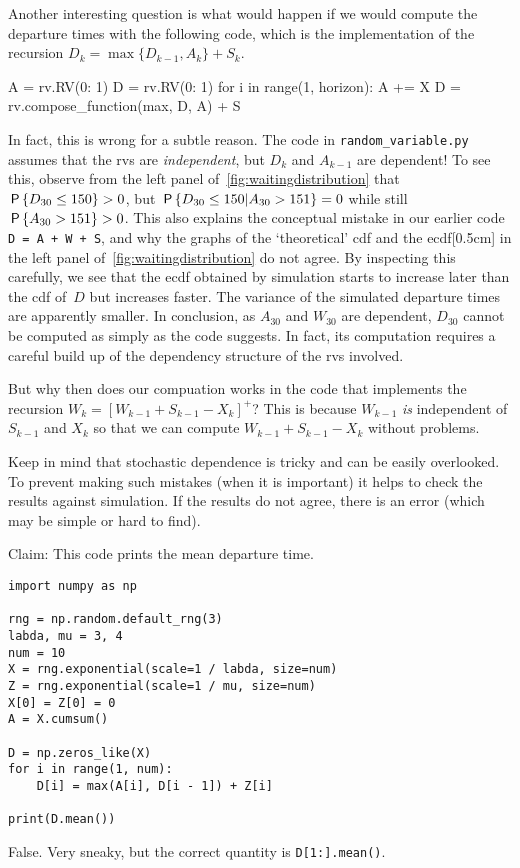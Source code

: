 \documentclass[stochastic-or.tex]{subfiles}
\begin{document}
Another interesting question is what would happen if we would compute the departure times with the following code, which is the implementation of the recursion $D_{k} = \max\{D_{k-1}, A_{k}\} + S_{k}$.
\begin{python}
A = rv.RV({0: 1})
D = rv.RV({0: 1})
for i in range(1, horizon):
    A += X
    D = rv.compose_function(max, D, A) + S
\end{python}
\noindent In fact, this is wrong for a subtle reason.
The code in \texttt{random_variable.py} assumes that the rvs are \emph{independent}, but $D_{k}$ and $A_{k-1}$ are dependent!
To see this, observe from the left panel of~\cref{fig:waitingdistribution} that $\P{D_{30} \leq 150} > 0$, but $\P{D_{30} \leq 150| A_{30} > 151} = 0$ while still $\P{A_{30} > 151} > 0$.
This also explains the conceptual
mistake in our earlier code \texttt{D = A + W + S}, and why the graphs of the `theoretical' cdf and the ecdf[0.5cm] in the left panel of~\cref{fig:waitingdistribution} do not agree.
By inspecting this carefully, we see that the ecdf obtained by simulation starts to increase later than the cdf of~$D$ but increases faster.
The variance of the simulated departure times are apparently smaller.
In conclusion, as $A_{30}$ and $W_{30}$ are dependent, $D_{30}$ cannot be computed as simply as the code suggests.
In fact, its computation requires a careful build up of the dependency structure of the rvs involved.

But why then does our compuation works in the code that implements the recursion $W_k = [W_{k-1} + S_{k-1} - X_k]^{+}$?
This is because $W_{k-1}$ \emph{is} independent of $S_{k-1}$ and $X_{k}$ so that we can compute $W_{k-1}+ S_{k-1} - X_{k}$ without problems.

Keep in mind that stochastic dependence is  tricky and can be easily overlooked.
To prevent making such mistakes (when it is important) it helps to check the results against simulation.
If the results do not agree, there is an error (which may be simple or hard to find).


\begin{truefalse}
Claim: This code prints the mean departure time.
\begin{verbatim}
import numpy as np

rng = np.random.default_rng(3)
labda, mu = 3, 4
num = 10
X = rng.exponential(scale=1 / labda, size=num)
Z = rng.exponential(scale=1 / mu, size=num)
X[0] = Z[0] = 0
A = X.cumsum()

D = np.zeros_like(X)
for i in range(1, num):
    D[i] = max(A[i], D[i - 1]) + Z[i]

print(D.mean())
\end{verbatim}
\begin{solution}
        False. Very sneaky, but the correct quantity is \texttt{D[1:].mean()}.
\end{solution}
\end{truefalse}
\end{document}
